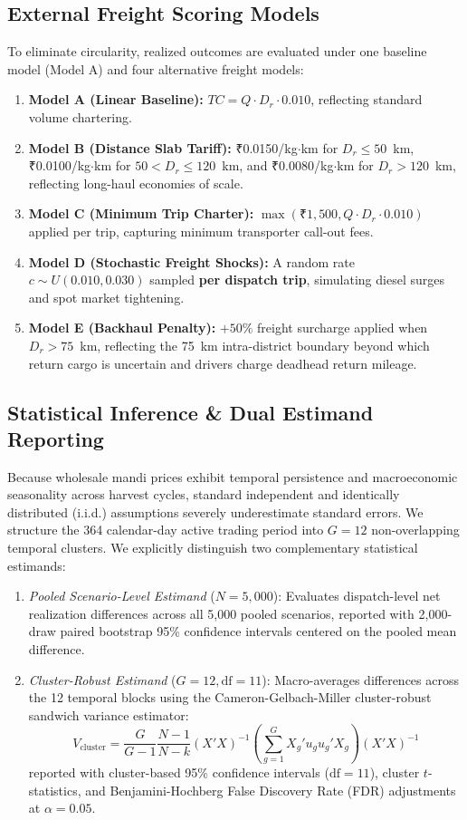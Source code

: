 \documentclass[journal]{IEEEtran}
\begin{document}
\subsection{External Freight Scoring Models}
To eliminate circularity, realized outcomes are evaluated under one baseline model (Model A) and four alternative freight models:
\begin{enumerate}
    \item \textbf{Model A (Linear Baseline):} $TC = Q \cdot D_r \cdot 0.010$, reflecting standard volume chartering.
    \item \textbf{Model B (Distance Slab Tariff):} ₹0.0150/kg$\cdot$km for $D_r \le 50$~km, ₹0.0100/kg$\cdot$km for $50 < D_r \le 120$~km, and ₹0.0080/kg$\cdot$km for $D_r > 120$~km, reflecting long-haul economies of scale.
    \item \textbf{Model C (Minimum Trip Charter):} $\max(\text{₹}1,500, Q \cdot D_r \cdot 0.010)$ applied per trip, capturing minimum transporter call-out fees.
    \item \textbf{Model D (Stochastic Freight Shocks):} A random rate $c \sim U(0.010, 0.030)$ sampled \textbf{per dispatch trip}, simulating diesel surges and spot market tightening.
    \item \textbf{Model E (Backhaul Penalty):} $+50\%$ freight surcharge applied when $D_r > 75$~km, reflecting the 75~km intra-district boundary beyond which return cargo is uncertain and drivers charge deadhead return mileage.
\end{enumerate}

\subsection{Statistical Inference \& Dual Estimand Reporting}
Because wholesale mandi prices exhibit temporal persistence and macroeconomic seasonality across harvest cycles, standard independent and identically distributed (i.i.d.) assumptions severely underestimate standard errors. We structure the 364 calendar-day active trading period into $G = 12$ non-overlapping temporal clusters. We explicitly distinguish two complementary statistical estimands:
\begin{enumerate}
    \item \textit{Pooled Scenario-Level Estimand} ($N = 5,000$): Evaluates dispatch-level net realization differences across all 5,000 pooled scenarios, reported with 2,000-draw paired bootstrap 95\% confidence intervals centered on the pooled mean difference.
    \item \textit{Cluster-Robust Estimand} ($G = 12, \text{df} = 11$): Macro-averages differences across the 12 temporal blocks using the Cameron-Gelbach-Miller cluster-robust sandwich variance estimator:
    \begin{equation}
    V_{\text{cluster}} = \frac{G}{G-1} \frac{N-1}{N-k} (X'X)^{-1} \left( \sum_{g=1}^G X_g' u_g u_g' X_g \right) (X'X)^{-1}
    \end{equation}
    reported with cluster-based 95\% confidence intervals ($\text{df} = 11$), cluster $t$-statistics, and Benjamini-Hochberg False Discovery Rate (FDR) adjustments at $\alpha = 0.05$.
\end{enumerate}
\end{document}
